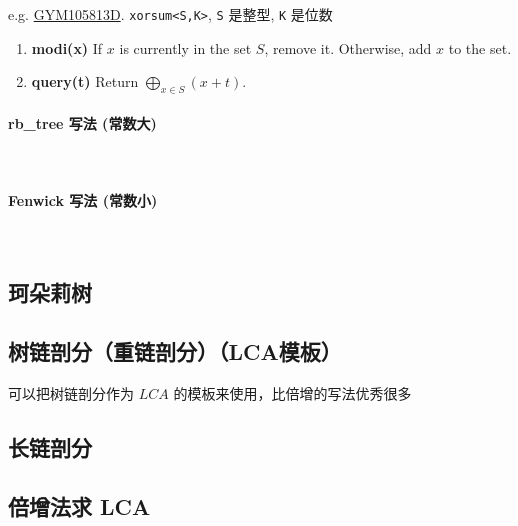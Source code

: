 \documentclass[12pt]{article}
\theoremstyle{definition}
\theoremstyle{remark}
\newcommand{\subsubsubsection}[1]{\paragraph{#1}\mbox{}\\}
\begin{document}
e.g. \href{https://codeforces.com/gym/105813/problem/D}{GYM105813D}. \texttt{xorsum<S,K>}, \texttt{S} 是整型, \texttt{K} 是位数

\begin{enumerate}
	\item \textbf{modi(x)} If $x$ is currently in the set $S$, remove it. Otherwise, add $x$ to the set.
	\item \textbf{query(t)} Return $\displaystyle\bigoplus_{x \in S} (x + t)$.
\end{enumerate}

\subsubsubsection{rb\_{}tree 写法 (常数大)}



\newpage

\subsubsubsection{Fenwick 写法 (常数小)}



\newpage

\subsection{珂朵莉树}



\newpage

\subsection{树链剖分（重链剖分）（LCA模板）}

可以把树链剖分作为 $LCA$ 的模板来使用，比倍增的写法优秀很多



\subsection{长链剖分}



\newpage

\subsection{倍增法求 LCA}
\end{document}
